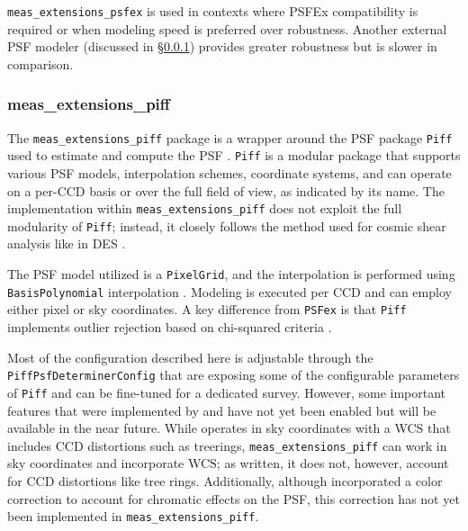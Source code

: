 \texttt{meas\_extensions\_psfex} is used in contexts where PSFEx compatibility is required or when modeling speed is preferred over robustness.
Another external PSF modeler (discussed in \S\ref{sec:meas_extensions_piff}) provides greater robustness but is slower in comparison.

\subsubsection{meas\_extensions\_piff}
\label{sec:meas_extensions_piff}

The \texttt{meas\_extensions\_piff} package is a wrapper around the PSF package \texttt{Piff} used to estimate and compute the PSF \citep{2021ascl.soft02024J,2021MNRAS.501.1282J}.
\texttt{Piff} is a modular package that supports various PSF models, interpolation schemes, coordinate systems, and can operate on
a per-CCD basis or over the full field of view, as indicated by its name.
The implementation within  \texttt{meas\_extensions\_piff} does not exploit the full modularity of \texttt{Piff}; instead, it closely follows the method used for cosmic shear analysis like in DES \citep{2021MNRAS.501.1282J,2025OJAp....8E..26S}.

The PSF model utilized is a \texttt{PixelGrid}, and the interpolation is performed using \texttt{BasisPolynomial} interpolation \citep{2021MNRAS.501.1282J}.
Modeling is executed per CCD and can employ either pixel or sky coordinates.
A key difference from \texttt{PSFex} is that  \texttt{Piff} implements outlier rejection based on chi-squared criteria \citep[see][for more details]{2021MNRAS.501.1282J}.

Most of the configuration described here is adjustable through the \texttt{PiffPsfDeterminerConfig} that are exposing some of the configurable parameters of \texttt{Piff} and can be fine-tuned for a dedicated survey.
However, some important features that were implemented by \citet{2021MNRAS.501.1282J} and \citet{2025OJAp....8E..26S} have not yet been enabled but will be available in the near future.
While \citet{2021MNRAS.501.1282J} operates in sky coordinates with a WCS that includes CCD distortions such as treerings,  \texttt{meas\_extensions\_piff} can work in sky coordinates and incorporate WCS; as written, it does not, however, account for CCD distortions like tree rings.
Additionally, although \citet{2025OJAp....8E..26S} incorporated a color correction to account for chromatic effects on the PSF, this correction has not yet been implemented in  \texttt{meas\_extensions\_piff}.
